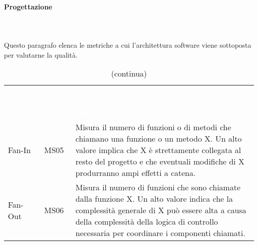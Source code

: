 			\paragraph{Progettazione}\mbox{} \\ \mbox{} \\
			Questo paragrafo elenca le metriche a cui l'architettura software viene sottoposta per valutarne la qualità.
   \begin{longtable}{ C{4.5cm} c L{9.5cm} }
	\caption{Metriche per la qualità dell'architettura software}\\
		\textcolor{white}{\textbf{Nome}} & \textcolor{white}{\textbf{Codice}} & \centerline{\textcolor{white}{\textbf{Descrizione}}} \\
		\endfirsthead
		\caption[]{(continua)} \\
		\textcolor{white}{\textbf{Nome}} & \textcolor{white}{\textbf{Codice}} & \centerline{\textcolor{white}{\textbf{Descrizione}}} \\
		\endhead
		Fan-In & MS05 & Misura il numero di funzioni o di metodi che chiamano una funzione o un metodo X. Un alto valore implica che X è strettamente collegata al resto del progetto e che eventuali modifiche di X produrranno ampi effetti a catena.\\
		Fan-Out & MS06 & Misura il numero di funzioni che sono chiamate dalla funzione X. Un alto valore indica che la complessità generale di X può essere alta a causa della complessità della logica di controllo necessaria per coordinare i componenti chiamati.\\
	\end{longtable}
	\begin{comment}
			\begin{itemize}
						\item \textbf{Fan-In}: misura il numero di funzioni o di metodi che chiamano una funzione o un metodo X. Un alto valore implica che X è strettamente collegata al resto del progetto e che eventuali modifiche di X produrranno ampi effetti a catena;
		\item \textbf{Fan-Out}: misura il numero di funzioni che sono chiamate dalla funzione X. Un alto valore indica che la complessità generale di X può essere alta a causa della complessità della logica di controllo necessaria per coordinare i componenti chiamati.
			\end{itemize}
			\end{comment}
